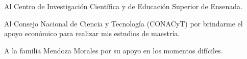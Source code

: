 
\hspace{12pt}
\bigskip

Al Centro de Investigación Científica y de Educación Superior de Ensenada.
\bigskip

Al Consejo Nacional de Ciencia y Tecnología (CONACyT) por brindarme el apoyo econ\'omico para realizar mis estudios de maestría.
\bigskip

A la familia Mendoza Morales por su apoyo en los momentos dif\'iciles.
